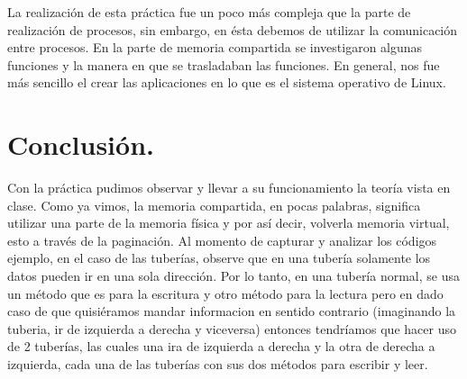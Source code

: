 \documentclass[12pt]{article}
\begin{document}
La realización de esta práctica fue un poco más compleja que la parte de realización de procesos, sin embargo, en ésta debemos de utilizar la comunicación entre procesos. En la parte de memoria compartida se investigaron algunas funciones y la manera en que se trasladaban las funciones. En general, nos fue más sencillo el crear las aplicaciones en lo que es el sistema operativo de Linux.

\section{Conclusión.}

Con la práctica pudimos observar y llevar a su funcionamiento la teoría vista en clase. Como ya vimos, la memoria compartida, en pocas palabras, significa utilizar una parte de la memoria física y por así decir, volverla memoria virtual, esto a través de la paginación. Al momento de capturar y analizar los códigos ejemplo, en el caso de las tuberías, observe que en una tubería solamente los datos pueden ir en una sola dirección. Por lo tanto, en una tubería normal, se usa un método que es para la escritura y otro método para la lectura pero en dado caso de que quisiéramos mandar informacion en sentido contrario (imaginando la tuberia, ir de izquierda a derecha y viceversa) entonces tendríamos que hacer uso de 2 tuberías, las cuales una ira de izquierda a derecha y la otra de derecha a izquierda, cada una de las tuberías con sus dos métodos para escribir y leer.
\end{document}
